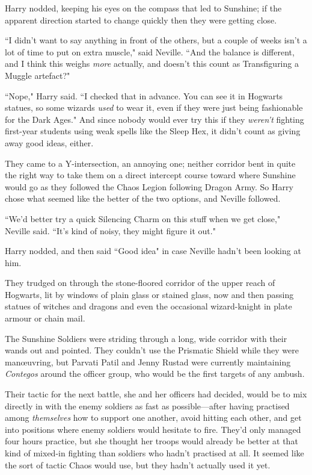 Harry nodded, keeping his eyes on the compass that led to Sunshine; if the apparent direction started to change quickly then they were getting close.

``I didn't want to say anything in front of the others, but a couple of weeks isn't a lot of time to put on extra muscle," said Neville. ``And the balance is different, and I think this weighs \emph{more} actually, and doesn't this count as Transfiguring a Muggle artefact?"

``Nope," Harry said. ``I checked that in advance. You can see it in Hogwarts statues, so some wizards \emph{used} to wear it, even if they were just being fashionable for the Dark Ages." And since nobody would ever try this if they \emph{weren't} fighting first-year students using weak spells like the Sleep Hex, it didn't count as giving away good ideas, either.

They came to a Y-intersection, an annoying one; neither corridor bent in quite the right way to take them on a direct intercept course toward where Sunshine would go as they followed the Chaos Legion following Dragon Army. So Harry chose what seemed like the better of the two options, and Neville followed.

``We'd better try a quick Silencing Charm on this stuff when we get close," Neville said. ``It's kind of noisy, they might figure it out."

Harry nodded, and then said ``Good idea" in case Neville hadn't been looking at him.

They trudged on through the stone-floored corridor of the upper reach of Hogwarts, lit by windows of plain glass or stained glass, now and then passing statues of witches and dragons and even the occasional wizard-knight in plate armour or chain mail.

\later

The Sunshine Soldiers were striding through a long, wide corridor with their wands out and pointed. They couldn't use the Prismatic Shield while they were manœuvring, but Parvati Patil and Jenny Rustad were currently maintaining \emph{Contegos} around the officer group, who would be the first targets of any ambush.

Their tactic for the next battle, she and her officers had decided, would be to mix directly in with the enemy soldiers as fast as possible—after having practised among \emph{themselves} how to support one another, avoid hitting each other, and get into positions where enemy soldiers would hesitate to fire. They'd only managed four hours practice, but she thought her troops would already be better at that kind of mixed-in fighting than soldiers who hadn't practised at all. It seemed like the sort of tactic Chaos would use, but they hadn't actually used it yet.


